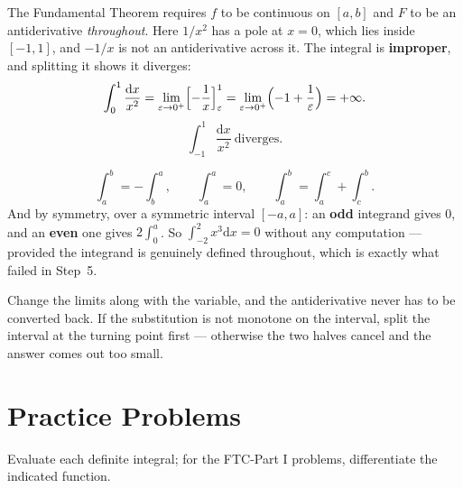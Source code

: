 \begin{worked}
The Fundamental Theorem requires $f$ to be continuous on $[a,b]$ and $F$ to
be an antiderivative \emph{throughout}. Here $1/x^{2}$ has a pole at $x=0$,
which lies inside $[-1,1]$, and $-1/x$ is not an antiderivative across it.
The integral is \textbf{improper}, and splitting it shows it diverges:
\[
  \int_{0}^{1}\frac{\mathrm{d}x}{x^{2}}
  =\lim_{\varepsilon\to0^{+}}\Bigl[-\frac1x\Bigr]_{\varepsilon}^{1}
  =\lim_{\varepsilon\to0^{+}}\Bigl(-1+\frac{1}{\varepsilon}\Bigr)=+\infty .
\]
\[
  \boxed{\int_{-1}^{1}\frac{\mathrm{d}x}{x^{2}}\ \text{diverges.}}
\]

\[
  \int_{a}^{b}=-\int_{b}^{a},
  \qquad
  \int_{a}^{a}=0,
  \qquad
  \int_{a}^{b}=\int_{a}^{c}+\int_{c}^{b} .
\]
And by symmetry, over a symmetric interval $[-a,a]$: an \textbf{odd}
integrand gives $0$, and an \textbf{even} one gives $2\int_{0}^{a}$. So
$\int_{-2}^{2}x^{3}\mathrm{d}x=0$ without any computation --- provided the
integrand is genuinely defined throughout, which is exactly what failed in
Step~5.

Change the limits along with the variable, and the antiderivative never has
to be converted back. If the substitution is not monotone on the interval,
split the interval at the turning point first --- otherwise the two halves
cancel and the answer comes out too small.
\end{worked}

\section{Practice Problems}

Evaluate each definite integral; for the FTC-Part I problems,
differentiate the indicated function.

